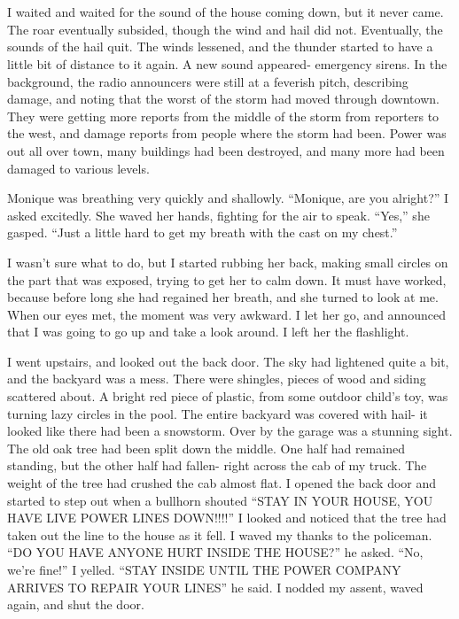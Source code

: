 \chapter{}
I waited and waited for the sound of the house coming down, but it never came. The roar
eventually subsided, though the wind and hail did not. Eventually, the sounds of the hail quit.
The winds lessened, and the thunder started to have a little bit of distance to it again. A new
sound appeared- emergency sirens. In the background, the radio announcers were still at a
feverish pitch, describing damage, and noting that the worst of the storm had moved through
downtown. They were getting more reports from the middle of the storm from reporters to the
west, and damage reports from people where the storm had been. Power was out all over town, many
buildings had been destroyed, and many more had been damaged to various levels.

Monique was breathing very quickly and shallowly. ``Monique, are you alright?'' I asked
excitedly. She waved her hands, fighting for the air to speak. ``Yes,'' she gasped. ``Just a
little hard to get my breath with the cast on my chest.''

I wasn't sure what to do, but I started rubbing her back, making small circles on the part
that was exposed, trying to get her to calm down. It must have worked, because before long she
had regained her breath, and she turned to look at me. When our eyes met, the moment was very
awkward. I let her go, and announced that I was going to go up and take a look around. I left
her the flashlight.

I went upstairs, and looked out the back door. The sky had lightened quite a bit, and the
backyard was a mess. There were shingles, pieces of wood and siding scattered about. A bright
red piece of plastic, from some outdoor child's toy, was turning lazy circles in the pool. The
entire backyard was covered with hail- it looked like there had been a snowstorm. Over by the
garage was a stunning sight. The old oak tree had been split down the middle. One half had
remained standing, but the other half had fallen- right across the cab of my truck. The weight
of the tree had crushed the cab almost flat. I opened the back door and started to step out when
a bullhorn shouted ``STAY IN YOUR HOUSE, YOU HAVE LIVE POWER LINES DOWN!!!!'' I looked and
noticed that the tree had taken out the line to the house as it fell. I waved my thanks to the
policeman. ``DO YOU HAVE ANYONE HURT INSIDE THE HOUSE?'' he asked. ``No, we're fine!'' I yelled.
``STAY INSIDE UNTIL THE POWER COMPANY ARRIVES TO REPAIR YOUR LINES'' he said. I nodded my
assent, waved again, and shut the door.

